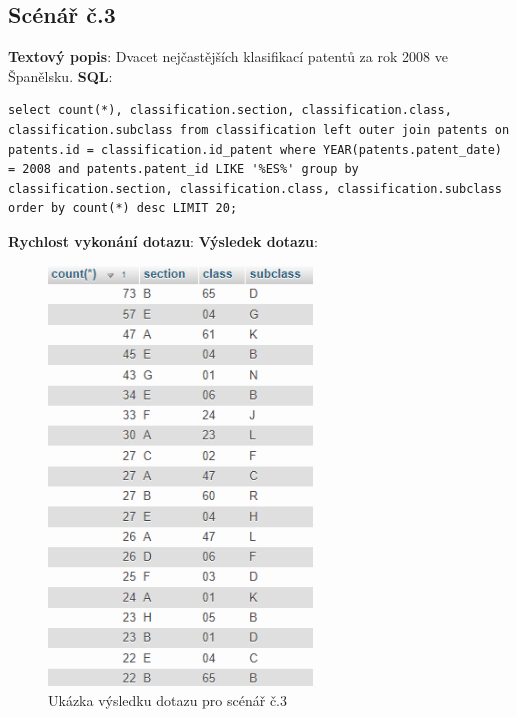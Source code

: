 \subsection{Scénář č.3}
\textbf{Textový popis}: Dvacet nejčastějších klasifikací patentů za rok 2008 ve Španělsku.
\newline
\textbf{SQL}: 
\begin{lstlisting}[label = {lst:elements_a}]
select count(*), classification.section, classification.class, classification.subclass from classification left outer join patents on patents.id = classification.id_patent where YEAR(patents.patent_date) = 2008 and patents.patent_id LIKE '%ES%' group by classification.section, classification.class, classification.subclass order by count(*) desc LIMIT 20;
\end{lstlisting}
\textbf{Rychlost vykonání dotazu}: 
\newline
\textbf{Výsledek dotazu}:
\begin{figure}[H]
\centering
\includegraphics[width=7cm]{img/scenare/scenar_3}
\caption{Ukázka výsledku dotazu pro scénář č.3}
\label{fig:scenar3}
\end{figure}

